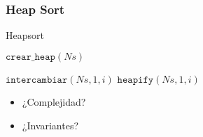 \documentclass{beamer}
\begin{document}
\begin{frame}
\frametitle{Heap Sort}

\begin{algorithm}[H]
    \caption{Heapsort}
    \begin{algorithmic}[1]

    \State $\mathtt{crear\_heap}(Ns)$

    \State $\mathtt{intercambiar}(Ns, 1, i)$
    \State $\mathtt{heapify}(Ns,1,i)$
    \EndFor
    \EndProcedure
    \end{algorithmic}
\end{algorithm}

\begin{itemize}
\item{¿Complejidad?}
\item{¿Invariantes?}
\end{itemize}

\end{frame}
\end{document}
